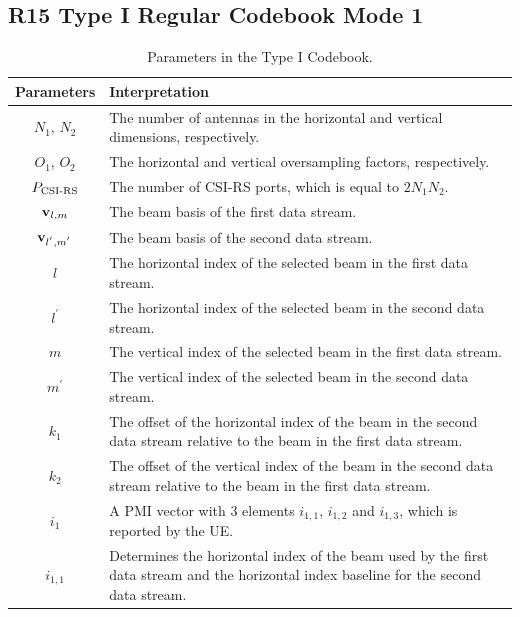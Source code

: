 \documentclass[lettersize,journal]{IEEEtran}
\begin{document}
\subsection{R15 Type I Regular Codebook Mode 1}

\begin{table}[t]   
\begin{center} 
\centering  
\captionsetup{
  labelsep=newline, %
}
\caption{Parameters in the Type I Codebook.}  
\renewcommand{\arraystretch}{1.5}  %
\label{codebook1} 
\begin{tabular}{|c|m{6cm}|}   
\hline   \textbf{Parameters} &\bf{Interpretation} \\  
\hline   $N_{1}$, $N_{2}$ & The number of antennas in the horizontal and vertical dimensions, respectively.\\ 
\hline   $O_{1}$, $O_{2}$ & The horizontal and vertical oversampling factors, respectively. \\
\hline   $P_{\rm{CSI\text{-}RS}}$ & The number of CSI-RS ports, which is equal to $2N_{1}N_{2}$.\\ 
\hline   ${\bf{v}}_{l,m}$ & The beam basis of the first data stream.\\
\hline   ${\bf{v}}_{l^{'},m^{'}}$ & The beam basis of the second data stream.\\
\hline   $l$ & The horizontal index of the selected beam in the first data stream.\\ 
\hline   $l^{'}$ & The horizontal index of the selected beam in the second data stream.\\
\hline   $m$ & The vertical index of the selected beam in the first data stream.\\ 
\hline   $m^{'}$ & The vertical index of the selected beam in the second data stream.\\
\hline   $k_1$ & The offset of the horizontal index of the beam in the second data stream relative to the beam in the first data stream.\\
\hline   $k_2$ & The offset of the vertical index of the beam in the second data stream relative to the beam in the first data stream.\\
\hline   \bf{$i_1$} & A PMI vector with 3 elements $i_{1,1}$, $i_{1,2}$ and $i_{1,3}$, which is reported by the UE.\\
\hline   $i_{1,1}$ & %
Determines the horizontal index of the beam used by the first data stream and the horizontal index baseline for the second data stream.\\

\end{tabular}
\end{center}
\end{table}
\end{document}
